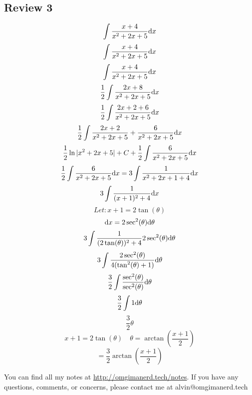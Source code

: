 \documentclass[letterpaper, 12pt]{math}
\begin{document}
\subsection*{Review 3}
\[ \int{\frac{x+4}{x^{2}+2x+5}\mathrm{d}{x}} \]
\[ \int{\frac{x+4}{x^{2}+2x+5}\mathrm{d}{x}} \]
\[ \int{\frac{x+4}{x^{2}+2x+5}\mathrm{d}{x}} \]
\[ \frac{1}{2}\int{\frac{2x+8}{x^{2}+2x+5}\mathrm{d}{x}} \]
\[ \frac{1}{2}\int{\frac{2x+2+6}{x^{2}+2x+5}\mathrm{d}{x}} \]
\[ \frac{1}{2}\int{\frac{2x+2}{x^{2}+2x+5}+\frac{6}{x^{2}+2x+5}\mathrm{d}{x}} \]
\[ \frac{1}{2}\ln|x^{2}+2x+5|+C+\frac{1}{2}\int{\frac{6}{x^{2}+2x+5}\mathrm{d}{x}} \]
\[ \frac{1}{2}\int{\frac{6}{x^{2}+2x+5}\mathrm{d}{x}} =
   3\int{\frac{1}{x^{2}+2x+1+4}\mathrm{d}{x}} \]
\[ 3\int{\frac{1}{(x+1)^{2}+4}\mathrm{d}{x}} \]
\[ Let: x+1 = 2\tan(\theta) \]
\[ \mathrm{d}{x} = 2\sec^{2}(\theta)\mathrm{d}{\theta} \]
\[ 3\int{\frac{1}{(2\tan(\theta))^{2}+4}2\sec^{2}(\theta)\mathrm{d}{\theta}} \]
\[ 3\int{\frac{2\sec^{2}(\theta)}{4(\tan^{2}(\theta)+1)}\mathrm{d}{\theta}} \]
\[ \frac{3}{2}\int{\frac{\sec^{2}(\theta)}{\sec^{2}(\theta)}\mathrm{d}{\theta}} \]
\[ \frac{3}{2}\int{1\mathrm{d}{\theta}} \]
\[ \frac{3}{2}\theta \]
\[ x+1 = 2\tan(\theta) \quad \theta = \arctan(\frac{x+1}{2}) \]
\[ = \frac{3}{2}\arctan(\frac{x+1}{2}) \]

\begin{center}
  You can find all my notes at \url{http://omgimanerd.tech/notes}. If you have
  any questions, comments, or concerns, please contact me at
  alvin@omgimanerd.tech
\end{center}
\end{document}
